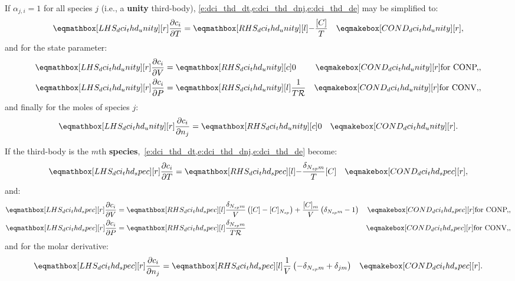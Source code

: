 \documentclass[12pt,number,sort&compress]{elsarticle}
\begin{document}
If $\alpha_{j,i} = 1$ for all species $j$ (i.e., a \textbf{unity} third-body), \cref{e:dci_thd_dt,e:dci_thd_dnj,e:dci_thd_de} may be simplified to:
\begin{align}
 \lhs{dci_thd_unity}{\frac{\partial c_{i} }{\partial T }} &= \rhs{dci_thd_unity}{- \frac{[C]}{T}}& \cond{dci_thd_unity}{,} \label{e:dci_thd_unity_dt}
\end{align}
and for the state parameter:
\begin{subequations}
 \label{e:dci_thd_unity_de}
 \begin{align}
  \lhs{dci_thd_unity}{\frac{\partial c_{i} }{\partial V }} &= \rhs{dci_thd_unity}{0}[c] & \cond{dci_thd_unity}{\dconp/,} \\
  \lhs{dci_thd_unity}{\frac{\partial c_{i} }{\partial P }} &= \rhs{dci_thd_unity}{\frac{1}{T \Ru/}}& \cond{dci_thd_unity}{\dconv/,}
 \end{align}
\end{subequations}
and finally for the moles of species $j$:
\begin{align}
  \label{e:dci_thd_unity_dnj}
  \lhs{dci_thd_unity}{\frac{\partial c_{i} }{\partial n_{j} }} &= \rhs{dci_thd_unity}{0}[c] & \cond{dci_thd_unity}{.}
\end{align}


If the third-body is the $m$th \textbf{species},~\cref{e:dci_thd_dt,e:dci_thd_dnj,e:dci_thd_de} become:
\begin{align}
 \lhs{dci_thd_spec}{\frac{\partial c_{i} }{\partial T }} &= \rhs{dci_thd_spec}{-\frac{\delta_{\ns/ m}}{T} [C]}&\cond{dci_thd_spec}{,} \label{e:dci_thd_spec_dt}
\end{align}
and:
\begin{subequations}
\label{e:dci_thd_spec_de}
\begin{align}
\lhs{dci_thd_spec}{\frac{\partial c_{i} }{\partial V }} &= \rhs{dci_thd_spec}{\frac{\delta_{\ns/ m}}{V} \left([C] - [C]_{\ns/}\right) + \frac{[C]_{m}}{V} \left(\delta_{\ns/ m} - 1\right)} & \cond{dci_thd_spec}{\dconp/,} \\
\lhs{dci_thd_spec}{\frac{\partial c_{i} }{\partial P }} &= \rhs{dci_thd_spec}{\frac{\delta_{\ns/ m}}{T \Ru/}} & \cond{dci_thd_spec}{\dconv/,}
\end{align}
\end{subequations}
and for the molar derivative:
\begin{align}
 \lhs{dci_thd_spec}{\frac{\partial c_{i} }{\partial n_j }} &= \rhs{dci_thd_spec}{\frac{1}{V} \left(- \delta_{\ns/ m} + \delta_{j m}\right)}&\cond{dci_thd_spec}{.} \label{e:dci_thd_spec_dnj}
\end{align}
\end{document}
